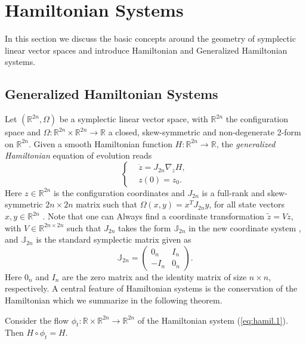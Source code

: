 \section{Hamiltonian Systems}
\label{sec:hamil}

In this section we discuss the basic concepts around the geometry of symplectic linear vector spaces and introduce Hamiltonian and Generalized Hamiltonian systems.

\subsection{Generalized Hamiltonian Systems}
\label{sec:hamil.1}

Let $(\mathbb R^{2n}, \Omega)$ be a symplectic linear vector space, with $\mathbb R^{2n}$ the configuration space and $\Omega:\mathbb R^{2n}\times\mathbb R^{2n} \to \mathbb R$ a closed, skew-symmetric and non-degenerate 2-form on $\mathbb R^{2n}$. Given a smooth Hamiltonian function $H:\mathbb R^{2n} \to \mathbb R$, the \emph{generalized Hamiltonian} equation of evolution reads
\begin{equation} \label{eq:hamil.1}
\left\{
\begin{aligned}
	& \dot z = J_{2n} \nabla_z H,  \\
	&  z(0) = z_0.
\end{aligned}
\right.
\end{equation}
Here $z\in \mathbb R^{2n}$ is the configuration coordinates and $J_{2n}$ is a full-rank and skew-symmetric $2n\times 2n$ matrix such that $\Omega(x,y) = x^TJ_{2n}y$, for all state vectors $x,y\in \mathbb R^{2n}$ \cite{Marsden:2010:IMS:1965128}. Note that one can Always find a coordinate transformation $\tilde z = V z$, with $V \in \mathbb R^{2n\times 2n}$ such that $J_{2n}$ takes the form $\mathbb{J}_{2n}$ in the new coordinate system \cite{de2006symplectic}, and $\mathbb{J}_{2n}$ is the standard symplectic matrix given as
\begin{equation} \label{eq:hamil.2}
	\mathbb{J}_{2n} = 
	\begin{pmatrix}
	0_n & I_n \\
	-I_n & 0_n
	\end{pmatrix}.
\end{equation}
Here $0_n$ and $I_n$ are the zero matrix and the identity matrix of size $n\times n$, respectively. A central feature of Hamiltonian systems is the conservation of the Hamiltonian which we summarize in the following theorem.
\begin{theorem} \label{thm:1}
Consider the flow $\phi_t:\mathbb R \times \mathbb R^{2n} \to \mathbb R^{2n}$ of the Hamiltonian system (\ref{eq:hamil.1}). Then $H \circ \phi_t = H$.
\end{theorem}

